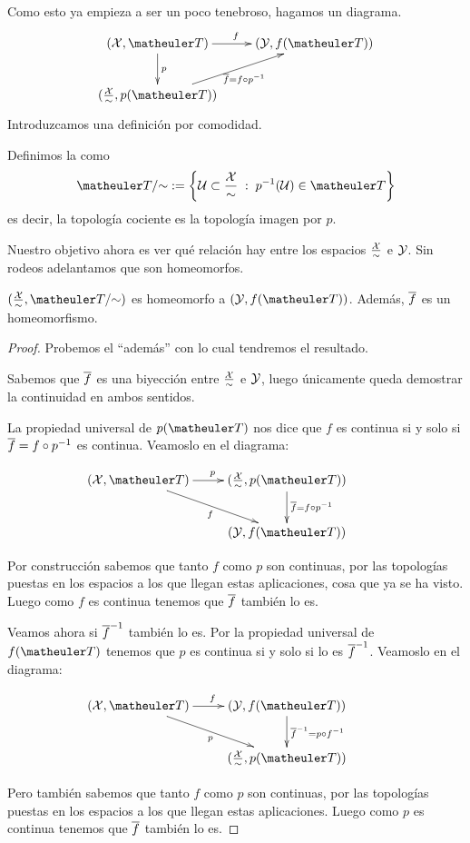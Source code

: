 Como esto ya empieza a ser un poco tenebroso, hagamos un diagrama.
\begin{equation*}
	\xymatrix{
		(\X,\T) \ar[r]^f \ar[d]^p& (\Y,f(\T))\\
		(\frac{\X}{\sim},p(\T))\ar[ru]_{\adher{f}=f\circ p^{-1}} & \\
	}
\end{equation*}
Introduzcamos una definición por comodidad.
\begin{defi}
	Definimos la  como
	\[\T/\mathord{\sim} := \left\{\U\subset\frac{\X}{\sim} \midc p^{-1}(\U)\in\T\right\}\]
	es decir, la topología cociente es la topología imagen por $p$.
\end{defi}
Nuestro objetivo ahora es ver qué relación hay entre los espacios $\frac{\mathcal{X}}{\sim}$ e $\mathcal{Y}$. Sin rodeos adelantamos que son homeomorfos.
\begin{prop}
	$(\frac{\X}{\sim},\T/\mathord{\sim})$ es homeomorfo a $(\Y,f(\T))$. Además, $\overline{f}$ es un homeomorfismo.
\end{prop}
\begin{proof}
	Probemos el ``además'' con lo cual tendremos el resultado.
	
	Sabemos que $\overline{f}$ es una biyección entre $\frac{\mathcal{X}}{\sim}$ e $\mathcal{Y}$, luego únicamente queda demostrar la continuidad en ambos sentidos.
	
	La propiedad universal de $p(\T)$ nos dice que $f$ es continua si y solo si $\overline{f} = f\circ p^{-1}$ es continua. Veamoslo en el diagrama:
	
		\begin{equation*}
		\xymatrix{
			(\X,\T) \ar[r]^p \ar[rd]_f &
			(\frac{\X}{\sim}, p(\T)) \ar[d]^{\adher{f}=f\circ p^{-1}} & \\
			&(\Y,f(\T))
		}
	\end{equation*}
	
	Por construcción sabemos que tanto $f$ como $p$ son continuas, por las topologías puestas en los espacios a los que llegan estas aplicaciones, cosa que ya se ha visto. Luego como $f$ es continua tenemos que $\overline{f}$ también lo es.
	
	Veamos ahora si $\overline{f}^{-1}$ también lo es. Por la propiedad universal de $f(\T)$ tenemos que $p$ es continua si y solo si lo es $\overline{f}^{-1}$. Veamoslo en el diagrama:
	
			\begin{equation*}
		\xymatrix{
			(\X,\T) \ar[r]^f \ar[rd]_p &
			(\Y,f(\T)) \ar[d]^{\adher{f}^{-1}=p\circ f^{-1}} & \\
			&(\frac{\X}{\sim}, p(\T))
		}
	\end{equation*}
	
	Pero también sabemos que tanto $f$ como $p$ son continuas, por las topologías puestas en los espacios a los que llegan estas aplicaciones. Luego como $p$ es continua tenemos que $\overline{f}$ también lo es.
\end{proof}
